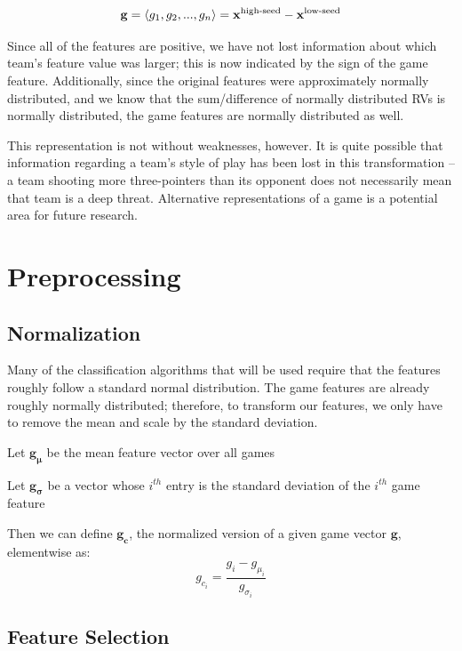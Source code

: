 \documentclass[]{article}
\def\SP#1{\textsuperscript{{#1}}}
\begin{document}
\begin{equation}
	\mathbf{g} = \langle g_1, g_2, ..., g_n \rangle = \mathbf{x\SP{high-seed}} - \mathbf{x\SP{low-seed}}
\end{equation}

Since all of the features are positive, we have not lost information about which team's feature value was larger; this is now indicated by the sign of the game feature. Additionally, since the original features were approximately normally distributed, and we know that the sum/difference of normally distributed RVs is normally distributed, the game features are normally distributed as well.

This representation is not without weaknesses, however. It is quite possible that information regarding a team's style of play has been lost in this transformation -- a team shooting more three-pointers than its opponent does not necessarily mean that team is a deep threat. Alternative representations of a game is a potential area for future research.

\section{Preprocessing}
\subsection{Normalization}
\label{subsec:normalization}

Many of the classification algorithms that will be used require that the features roughly follow a standard normal distribution. The game features are already roughly normally distributed; therefore, to transform our features, we only have to remove the mean and scale by the standard deviation.

Let $\mathbf{g_{\mu}}$ be the mean feature vector over all games

Let $\mathbf{g_{\sigma}}$ be a vector whose $i^{th}$ entry is the standard deviation of the $i^{th}$ game feature

Then we can define $\mathbf{g_{c}}$, the normalized version of a given game vector $\mathbf{g}$, elementwise as:
\begin{equation}
	g_{c_i} = \frac{g_i - g_{\mu_i}}{g_{\sigma_i}}
\end{equation}

\subsection{Feature Selection}
\end{document}
